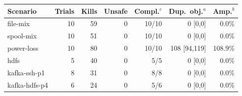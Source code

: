 
\begin{tabular}{@{}lrrrrrr@{}}
\toprule
Scenario & Trials & Kills & Unsafe & Compl.$^c$ & Dup.\ obj.$^a$ & Amp.$^b$ \\
\midrule
file-mix & 10 & 59 & 0 & 10/10 & 0 [0,0] & 0.0\% \\
spool-mix & 10 & 51 & 0 & 10/10 & 0 [0,0] & 0.0\% \\
power-loss & 10 & 80 & 0 & 10/10 & 108 [94,119] & 108.9\% \\
hdfs & 5 & 40 & 0 & 5/5 & 0 [0,0] & 0.0\% \\
kafka-ssh-p1 & 8 & 31 & 0 & 8/8 & 0 [0,0] & 0.0\% \\
kafka-hdfs-p4 & 6 & 24 & 0 & 5/6 & 0 [0,0] & 0.0\% \\
\bottomrule
\end{tabular}

